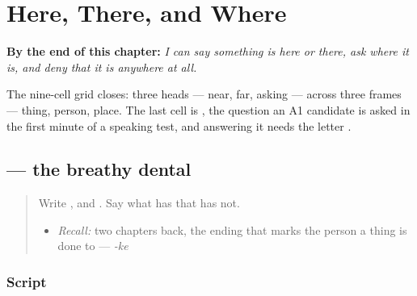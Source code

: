 
\chapter{Here, There, and Where}
\label{ch:bn-here-there-and-where}

\begin{chapteropening}
\textbf{By the end of this chapter:} \emph{I can say something is here or there, ask where it is, and deny that it is anywhere at all.}

The nine-cell grid closes: three heads — near, far, asking — across three frames — thing, person, place. The last cell is , the question an A1 candidate is asked in the first minute of a speaking test, and answering it needs the letter .
\end{chapteropening}

\section[\texorpdfstring{\bn{থ} (thô)}{থ (thô)}]{ — the breathy dental}

\label{lesson:BN-W05-tha}



\begin{quote}
Write \textbf{}, \textbf{} and \textbf{}. Say what \textbf{} has that \textbf{} has not.

\begin{itemize}
\raggedright
  \item \emph{Recall:} two chapters back, the ending that marks the person a thing is done to — \emph{-ke}
\end{itemize}
\end{quote}

\subsection*{Script}

\begin{quote}
\end{quote}

